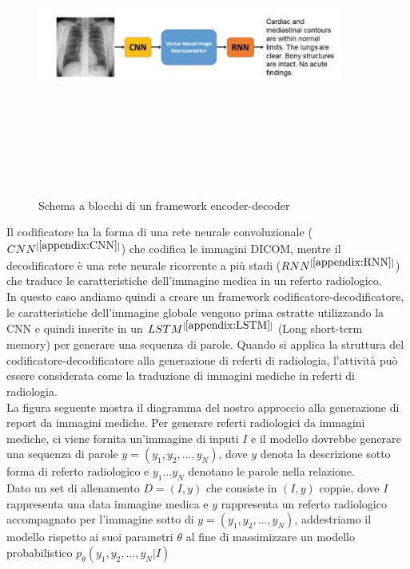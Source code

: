 \documentclass[12pt,a4paper]{report}
\begin{document}
\begin{figure}[h!]
    \begin{center}
        \includegraphics[width=10cm,height=10cm,keepaspectratio]{Encoder-Decoder}
    \end{center}
    \caption{Schema a blocchi di un framework encoder-decoder}
    \label{fig:econder-decoder}
\end{figure}



Il codificatore ha la forma di una rete neurale convoluzionale ($CNN^{[\ref{appendix:CNN}]}$) che codifica le immagini DICOM, mentre il decodificatore è una rete neurale ricorrente a più stadi ($RNN^{[\ref{appendix:RNN}]}$) che traduce le caratteristiche dell'immagine medica in un referto radiologico.\\
In questo caso andiamo quindi a creare un framework codificatore-decodificatore, le caratteristiche dell'immagine globale vengono prima estratte utilizzando la CNN e quindi inserite in un $LSTM^{[\ref{appendix:LSTM}]}$ (Long short-term memory) per generare una sequenza di parole. Quando si applica la struttura del codificatore-decodificatore alla generazione di referti di radiologia, l'attività può essere considerata come la traduzione di immagini mediche in referti di radiologia.\\
La figura seguente mostra il diagramma del nostro approccio alla generazione di report da immagini mediche. Per generare referti radiologici da immagini mediche, ci viene fornita un'immagine di inputi $I$ e il modello dovrebbe generare una sequenza di parole $y = (y_1, y_2, . . . ,y_N)$, dove $y$ denota la descrizione sotto forma di referto radiologico e $y_1 . . .y_N$ denotano le parole nella relazione.\\
Dato un set di allenamento $D = (I, y)$ che consiste in $(I, y)$ coppie, dove $I$ rappresenta una data immagine medica e $y$ rappresenta un referto radiologico accompagnato per l'immagine sotto di $y = (y_1, y_2, . . . ,y_N)$, addestriamo il modello rispetto ai suoi parametri $\theta$ al fine di massimizzare un modello probabilistico $p_{\theta}(y_1, y_2, . . . , y_N|I)$
\end{document}
